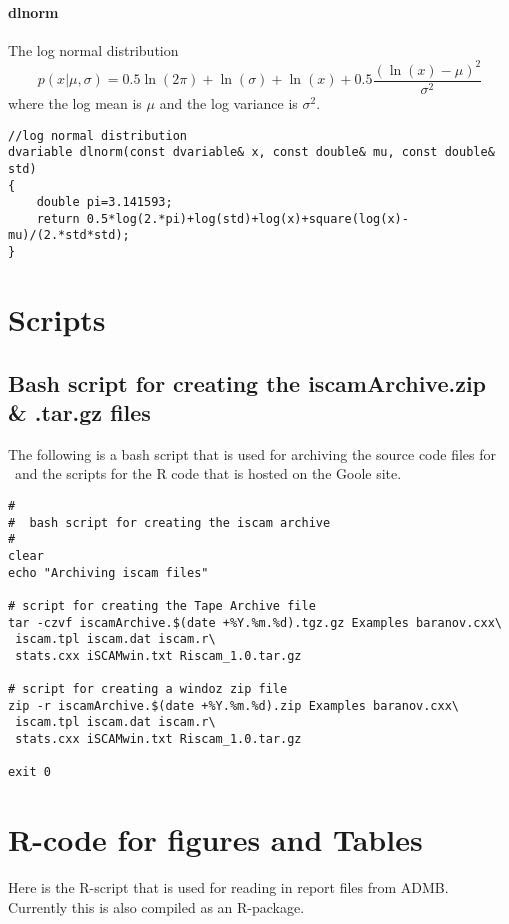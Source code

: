 \paragraph{dlnorm} The log normal distribution
\[
	p(x|\mu,\sigma) = 0.5\ln(2\pi)+\ln(\sigma)+\ln(x)+0.5\frac{(\ln(x)-\mu)^2}{\sigma^2}
\]
where the log mean is $\mu$ and the log variance is $\sigma^2$.
\begin{verbatim}
//log normal distribution
dvariable dlnorm(const dvariable& x, const double& mu, const double& std)
{
	double pi=3.141593;
	return 0.5*log(2.*pi)+log(std)+log(x)+square(log(x)-mu)/(2.*std*std);
}
\end{verbatim}


\section{Scripts}
\subsection{Bash script for creating the iscamArchive.zip \& .tar.gz files}
The following is a bash script that is used for archiving the source code files for \iscam\ and the scripts for the R code that is hosted on the Goole site.

\begin{lstlisting}
#
#  bash script for creating the iscam archive
#
clear
echo "Archiving iscam files"

# script for creating the Tape Archive file
tar -czvf iscamArchive.$(date +%Y.%m.%d).tgz.gz Examples baranov.cxx\
 iscam.tpl iscam.dat iscam.r\
 stats.cxx iSCAMwin.txt Riscam_1.0.tar.gz

# script for creating a windoz zip file
zip -r iscamArchive.$(date +%Y.%m.%d).zip Examples baranov.cxx\
 iscam.tpl iscam.dat iscam.r\
 stats.cxx iSCAMwin.txt Riscam_1.0.tar.gz

exit 0
\end{lstlisting}

\section{R-code for figures and Tables}


Here is the R-script that is used for reading in report files from ADMB.  Currently this is also compiled as an R-package.
\begin{scriptsize}

\end{scriptsize}
